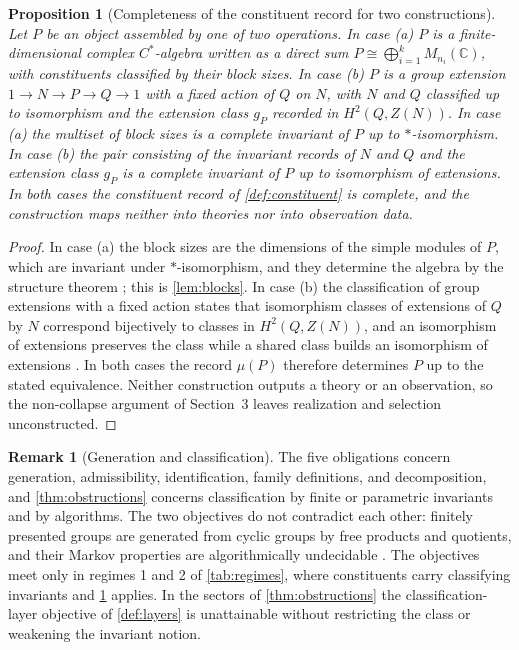 \documentclass[11pt,letterpaper]{article}
\newtheorem{proposition}[theorem]{Proposition}
\theoremstyle{definition}
\newtheorem{remark}[theorem]{Remark}
\begin{document}
\begin{proposition}[Completeness of the constituent record for two constructions]
\label{thm:conditional}
Let $P$ be an object assembled by one of two operations. In case (a) $P$ is a finite-dimensional complex $C^*$-algebra written as a direct sum $P \cong \bigoplus_{i=1}^{k} M_{n_i}(\mathbb{C})$, with constituents classified by their block sizes. In case (b) $P$ is a group extension $1 \to N \to P \to Q \to 1$ with a fixed action of $Q$ on $N$, with $N$ and $Q$ classified up to isomorphism and the extension class $g_P$ recorded in $H^2(Q, Z(N))$. In case (a) the multiset of block sizes is a complete invariant of $P$ up to $*$-isomorphism. In case (b) the pair consisting of the invariant records of $N$ and $Q$ and the extension class $g_P$ is a complete invariant of $P$ up to isomorphism of extensions. In both cases the constituent record of \cref{def:constituent} is complete, and the construction maps neither into theories nor into observation data.
\end{proposition}

\begin{proof}
In case (a) the block sizes are the dimensions of the simple modules of $P$, which are invariant under $*$-isomorphism, and they determine the algebra by the structure theorem \cite{corpus-9,corpus-42}; this is \cref{lem:blocks}. In case (b) the classification of group extensions with a fixed action states that isomorphism classes of extensions of $Q$ by $N$ correspond bijectively to classes in $H^2(Q, Z(N))$, and an isomorphism of extensions preserves the class while a shared class builds an isomorphism of extensions \cite{corpus-72}. In both cases the record $\mu(P)$ therefore determines $P$ up to the stated equivalence. Neither construction outputs a theory or an observation, so the non-collapse argument of Section~3 leaves realization and selection unconstructed.
\end{proof}

\begin{remark}[Generation and classification]
\label{rem:incompat}
The five obligations concern generation, admissibility, identification, family definitions, and decomposition, and \cref{thm:obstructions} concerns classification by finite or parametric invariants and by algorithms. The two objectives do not contradict each other: finitely presented groups are generated from cyclic groups by free products and quotients, and their Markov properties are algorithmically undecidable \cite{corpus-53}. The objectives meet only in regimes 1 and 2 of \cref{tab:regimes}, where constituents carry classifying invariants and \cref{thm:conditional} applies. In the sectors of \cref{thm:obstructions} the classification-layer objective of \cref{def:layers} is unattainable without restricting the class or weakening the invariant notion.
\end{remark}
\end{document}
